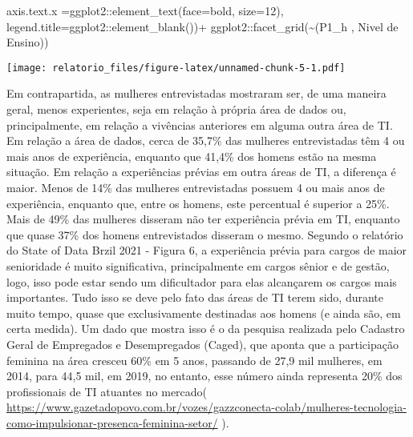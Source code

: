 \documentclass[
]{article}
\newenvironment{Shaded}{\begin{snugshade}}{\end{snugshade}}
\newcommand{\AttributeTok}[1]{\textcolor[rgb]{0.77,0.63,0.00}{#1}}
\newcommand{\DecValTok}[1]{\textcolor[rgb]{0.00,0.00,0.81}{#1}}
\newcommand{\FunctionTok}[1]{\textcolor[rgb]{0.00,0.00,0.00}{#1}}
\newcommand{\NormalTok}[1]{#1}
\newcommand{\SpecialCharTok}[1]{\textcolor[rgb]{0.00,0.00,0.00}{#1}}
\newcommand{\StringTok}[1]{\textcolor[rgb]{0.31,0.60,0.02}{#1}}
\begin{document}
\begin{Shaded}
\begin{Highlighting}[]
                 \AttributeTok{axis.text.x =}\NormalTok{ggplot2}\SpecialCharTok{::}\FunctionTok{element\_text}\NormalTok{(}\AttributeTok{face=}\StringTok{\textquotesingle{}bold\textquotesingle{}}\NormalTok{, }\AttributeTok{size=}\DecValTok{12}\NormalTok{),}
                 \AttributeTok{legend.title=}\NormalTok{ggplot2}\SpecialCharTok{::}\FunctionTok{element\_blank}\NormalTok{())}\SpecialCharTok{+}
\NormalTok{                   ggplot2}\SpecialCharTok{::}\FunctionTok{facet\_grid}\NormalTok{(}\SpecialCharTok{\textasciitilde{}}\StringTok{\textasciigrave{}}\AttributeTok{(\textquotesingle{}P1\_h \textquotesingle{}, \textquotesingle{}Nivel de Ensino\textquotesingle{})}\StringTok{\textasciigrave{}}\NormalTok{)}
\end{Highlighting}
\end{Shaded}

\texttt{[image: relatorio\_files/figure-latex/unnamed-chunk-5-1.pdf]}

Em contrapartida, as mulheres entrevistadas mostraram ser, de uma
maneira geral, menos experientes, seja em relação à própria área de
dados ou, principalmente, em relação a vivências anteriores em alguma
outra área de TI. Em relação a área de dados, cerca de 35,7\% das
mulheres entrevistadas têm 4 ou mais anos de experiência, enquanto que
41,4\% dos homens estão na mesma situação. Em relação a experiências
prévias em outra áreas de TI, a diferença é maior. Menos de 14\% das
mulheres entrevistadas possuem 4 ou mais anos de experiência, enquanto
que, entre os homens, este percentual é superior a 25\%. Mais de 49\%
das mulheres disseram não ter experiência prévia em TI, enquanto que
quase 37\% dos homens entrevistados disseram o mesmo. Segundo o
relatório do State of Data Brzil 2021 - Figura 6, a experiência prévia
para cargos de maior senioridade é muito significativa, principalmente
em cargos sênior e de gestão, logo, isso pode estar sendo um
dificultador para elas alcançarem os cargos mais importantes. Tudo isso
se deve pelo fato das áreas de TI terem sido, durante muito tempo, quase
que exclusivamente destinadas aos homens (e ainda são, em certa medida).
Um dado que mostra isso é o da pesquisa realizada pelo Cadastro Geral de
Empregados e Desempregados (Caged), que aponta que a participação
feminina na área cresceu 60\% em 5 anos, passando de 27,9 mil mulheres,
em 2014, para 44,5 mil, em 2019, no entanto, esse número ainda
representa 20\% dos profissionais de TI atuantes no mercado(
\url{https://www.gazetadopovo.com.br/vozes/gazzconecta-colab/mulheres-tecnologia-como-impulsionar-presenca-feminina-setor/}
).
\end{document}
